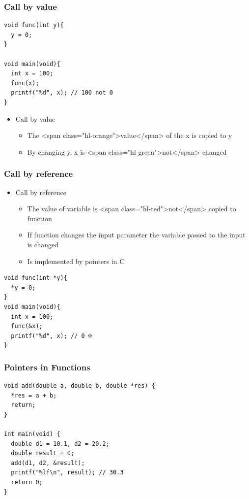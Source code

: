 \documentclass{../c-lecture}
\begin{document}
\begin{frame}[fragile]
  \frametitle{Call by value}
  \begin{verbatim}
void func(int y){
  y = 0;
}

void main(void){
  int x = 100;
  func(x);
  printf("%d", x); // 100 not 0
}
  \end{verbatim}
  \begin{itemize}
    \item Call by value
    \begin{itemize}
      \item The <span class="hl-orange">value</span> of the x is copied to y
      \item By changing y, x is <span class="hl-green">not</span> changed
    \end{itemize}
  \end{itemize}
\end{frame}

\begin{frame}[fragile]
  \frametitle{Call by reference}
  \begin{itemize}
    \item Call by reference
    \begin{itemize}
      \item
        The value of variable is <span class="hl-red">not</span> copied to
        function
      \item
        If function changes the input parameter \textrightarrow the variable passed to
        the input is changed
      \item Is implemented by pointers in C
    \end{itemize}
  \end{itemize}
  \begin{verbatim}
void func(int *y){
  *y = 0;
}
void main(void){
  int x = 100;
  func(&x);
  printf("%d", x); // 0 ☺️
}
  \end{verbatim}
\end{frame}

\begin{frame}[fragile]
  \frametitle{Pointers in Functions}
  \begin{verbatim}
void add(double a, double b, double *res) {
  *res = a + b;
  return;
}

int main(void) {
  double d1 = 10.1, d2 = 20.2;
  double result = 0;
  add(d1, d2, &result);
  printf("%lf\n", result); // 30.3
  return 0;
}
  \end{verbatim}
\end{frame}
\end{document}
